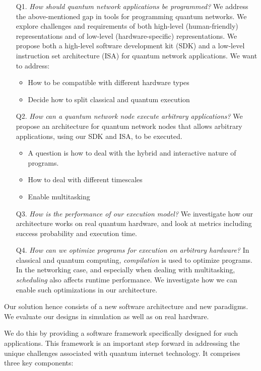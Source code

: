 \begin{itemize}
  \item[Q1.] \textit{How should quantum network applications be programmed?}
    We address the above-mentioned gap in tools for programming quantum networks. 
    We explore challenges and requirements of both high-level (human-friendly) representations and of low-level (hardware-specific) representations.
    We propose both a high-level software development kit (SDK) and a low-level instruction set architecture (ISA) for quantum network applications.
    We want to address:
    \begin{itemize}
      \item How to be compatible with different hardware types
      \item Decide how to split classical and quantum execution
    \end{itemize}
  \item[Q2.] \textit{How can a quantum network node execute arbitrary applications?}
    We propose an architecture for quantum network nodes that allows arbitrary applications, using our SDK and ISA, to be executed.
    \begin{itemize}
      \item A question is how to deal with the hybrid and interactive nature of programs.
      \item How to deal with different timescales
      \item Enable multitasking
    \end{itemize}
  \item[Q3.] \textit{How is the performance of our execution model?}
    We investigate how our architecture works on real quantum hardware, and look at metrics including success probability and execution time.
  \item[Q4.] \textit{How can we optimize programs for execution on arbitrary hardware?}
    In classical and quantum computing, \emph{compilation} is used to optimize programs.
    In the networking case, and especially when dealing with multitasking, \emph{scheduling} also affects runtime performance.
    We investigate how we can enable such optimizations in our architecture.
\end{itemize}

Our solution hence consists of a new software architecture and new paradigms.
We evaluate our designs in simulation as well as on real hardware.

We do this by providing a software framework specifically designed for such applications.
This framework is an important step forward in addressing the unique challenges associated with quantum internet technology.
It comprises three key components:


